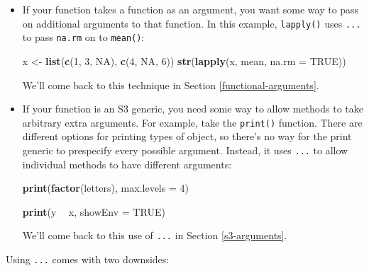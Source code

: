 \documentclass[]{book}
\newenvironment{Shaded}{\begin{snugshade}}{\end{snugshade}}
\newcommand{\KeywordTok}[1]{\textcolor[rgb]{0.13,0.29,0.53}{\textbf{#1}}}
\newcommand{\DataTypeTok}[1]{\textcolor[rgb]{0.13,0.29,0.53}{#1}}
\newcommand{\DecValTok}[1]{\textcolor[rgb]{0.00,0.00,0.81}{#1}}
\newcommand{\StringTok}[1]{\textcolor[rgb]{0.31,0.60,0.02}{#1}}
\newcommand{\OtherTok}[1]{\textcolor[rgb]{0.56,0.35,0.01}{#1}}
\newcommand{\OperatorTok}[1]{\textcolor[rgb]{0.81,0.36,0.00}{\textbf{#1}}}
\newcommand{\NormalTok}[1]{#1}
\theoremstyle{definition}
\theoremstyle{definition}
\theoremstyle{definition}
\theoremstyle{remark}
\begin{document}
\begin{itemize}
\item
  If your function takes a function as an argument, you want some way to
  pass on additional arguments to that function. In this example,
  \texttt{lapply()} uses \texttt{...} to pass \texttt{na.rm} on to
  \texttt{mean()}:

\begin{Shaded}
\begin{Highlighting}[]
\NormalTok{x <-}\StringTok{ }\KeywordTok{list}\NormalTok{(}\KeywordTok{c}\NormalTok{(}\DecValTok{1}\NormalTok{, }\DecValTok{3}\NormalTok{, }\OtherTok{NA}\NormalTok{), }\KeywordTok{c}\NormalTok{(}\DecValTok{4}\NormalTok{, }\OtherTok{NA}\NormalTok{, }\DecValTok{6}\NormalTok{))}
\KeywordTok{str}\NormalTok{(}\KeywordTok{lapply}\NormalTok{(x, mean, }\DataTypeTok{na.rm =} \OtherTok{TRUE}\NormalTok{))}
\end{Highlighting}
\end{Shaded}

  We'll come back to this technique in Section
  \ref{functional-arguments}.
\item
  If your function is an S3 generic, you need some way to allow methods
  to take arbitrary extra arguments. For example, take the
  \texttt{print()} function. There are different options for printing
  types of object, so there's no way for the print generic to prespecify
  every possible argument. Instead, it uses \texttt{...} to allow
  individual methods to have different arguments:

\begin{Shaded}
\begin{Highlighting}[]
\KeywordTok{print}\NormalTok{(}\KeywordTok{factor}\NormalTok{(letters), }\DataTypeTok{max.levels =} \DecValTok{4}\NormalTok{)}

\KeywordTok{print}\NormalTok{(y }\OperatorTok{~}\StringTok{ }\NormalTok{x, }\DataTypeTok{showEnv =} \OtherTok{TRUE}\NormalTok{)}
\end{Highlighting}
\end{Shaded}

  We'll come back to this use of \texttt{...} in Section
  \ref{s3-arguments}.
\end{itemize}

Using \texttt{...} comes with two downsides:
\end{document}
